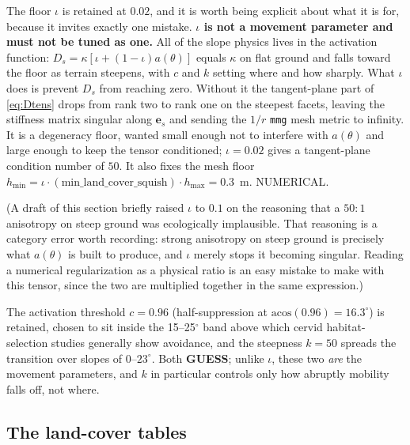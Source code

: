 \documentclass[11pt]{article}
\newcommand{\tagGUESS}{{\footnotesize\textsf{\textbf{\textcolor{red!70!black}{GUESS}}}}}
\newcommand{\tagNUM}{{\footnotesize\textsf{\textcolor{purple!70!black}{NUMERICAL}}}}
\begin{document}
The floor $\iota$ is retained at $0.02$, and it is worth being explicit about what it is for, because it invites exactly one mistake. \textbf{$\iota$ is not a movement parameter and must not be tuned as one.} All of the slope physics lives in the activation function: $D_s = \kappa[\iota + (1-\iota)a(\theta)]$ equals $\kappa$ on flat ground and falls toward the floor as terrain steepens, with $c$ and $k$ setting where and how sharply. What $\iota$ does is prevent $D_s$ from reaching zero. Without it the tangent-plane part of \eqref{eq:Dtens} drops from rank two to rank one on the steepest facets, leaving the stiffness matrix singular along $\mathbf{e}_s$ and sending the $1/r$ \texttt{mmg} mesh metric to infinity. It is a degeneracy floor, wanted small enough not to interfere with $a(\theta)$ and large enough to keep the tensor conditioned; $\iota = 0.02$ gives a tangent-plane condition number of $50$. It also fixes the mesh floor $h_{\min} = \iota\cdot(\text{min\_land\_cover\_squish})\cdot h_{\max} = 0.3$~m. \tagNUM{}.

(A draft of this section briefly raised $\iota$ to $0.1$ on the reasoning that a $50\!:\!1$ anisotropy on steep ground was ecologically implausible. That reasoning is a category error worth recording: strong anisotropy on steep ground is precisely what $a(\theta)$ is built to produce, and $\iota$ merely stops it becoming singular. Reading a numerical regularization as a physical ratio is an easy mistake to make with this tensor, since the two are multiplied together in the same expression.)

The activation threshold $c = 0.96$ (half-suppression at $\mathrm{acos}(0.96) = 16.3^\circ$) is retained, chosen to sit inside the 15--25$^\circ$ band above which cervid habitat-selection studies generally show avoidance, and the steepness $k = 50$ spreads the transition over slopes of $0$--$23^\circ$. Both \tagGUESS{}; unlike $\iota$, these two \emph{are} the movement parameters, and $k$ in particular controls only how abruptly mobility falls off, not where.

\subsection{The land-cover tables}
\label{sec:params-landcover}
\end{document}
